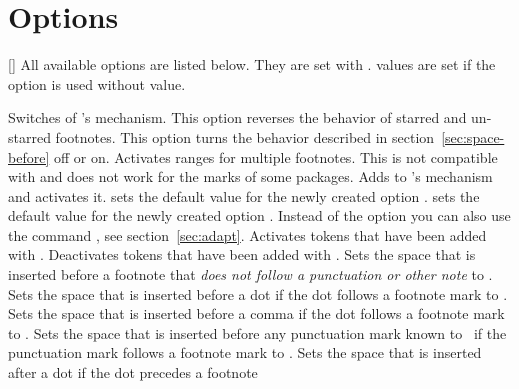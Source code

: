 \documentclass{fnpct-manual}
\begin{document}
\section{Options}\label{sec:options}
\begin{commands}
  []
    All available options are listed below. They are set with .
     values are set if the option is used without value.
\end{commands}
\begin{options}
    Switches of \fnpct's mechanism.
    This option reverses the behavior of starred and un-starred footnotes.
    This option turns the behavior described in
    section~\ref{sec:space-before} off or on.
    Activates ranges for multiple footnotes.  This is not compatible with
     and does not work for the marks of some packages.
    Adds  to \fnpct's mechanism and activates it. 
    sets the default value for the newly created option
    .  sets the default value for
    the newly created option .
    Instead of the option you can also use the command ,
    see section~\ref{sec:adapt}.
    Activates tokens that have been added with .
    Deactivates tokens that have been added with .
  \Default{.06em}
    Sets the space that is inserted before a footnote that \emph{does not
      follow a punctuation or other note} to .
  \Default{-.16em}
    Sets the space that is inserted before a dot if the dot follows a footnote
    mark to .
  \Default{-.16em}
    Sets the space that is inserted before a comma if the dot follows a footnote
    mark to .
    Sets the space that is inserted before any punctuation mark known to
    \fnpct\ if the punctuation mark follows a footnote mark to
    .
  \Default{-.06em}
    Sets the space that is inserted after a dot if the dot precedes a footnote

\end{options}
\end{document}
